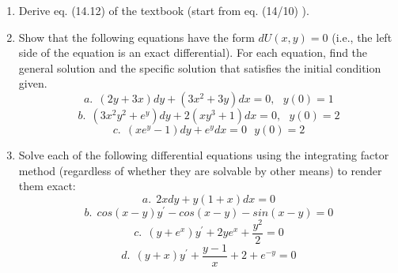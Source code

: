 \documentclass[fleqn]{article}
\begin{document}
\begin{enumerate}
    \item Derive eq. (14.12) of the textbook (start from eq. (14/10) ). 
    

    \item Show that the following equations have the form $dU(x,y)=0$ (i.e., the left side of the equation is an exact differential). For each equation, find the general solution and the specific solution that satisfies the initial condition given.
    \begin{equation*}
      a. ~~ (2y+3x)dy+(3x^2+3y)dx=0, ~~~ y(0)=1
    \end{equation*}
    \begin{equation*}
      b. ~~ (3x^2y^2+e^y)dy+2(xy^3+1)dx=0, ~~~ y(0)=2
    \end{equation*}
    \begin{equation*}
      c. ~~ (xe^y-1)dy+e^ydx=0 ~~~ y(0)=2
    \end{equation*}
    
    \item Solve each of the following differential equations using the integrating factor method (regardless of whether they are solvable by other means) to render them exact:
    \begin{equation*}
      a. ~~ 2xdy+y(1+x)dx=0
    \end{equation*}
    \begin{equation*}
      b. ~~ cos(x-y)y^{\prime}-cos(x-y)-sin(x-y)=0
    \end{equation*}
    \begin{equation*}
      c. ~~  (y+e^x)y^{\prime}+2ye^x+\dfrac{y^2}{2}=0
    \end{equation*}
    \begin{equation*}
      d. ~~ (y+x)y^{\prime}+\dfrac{y-1}{x}+2+e^{-y}=0
    \end{equation*}
  \end{enumerate}
\end{document}
